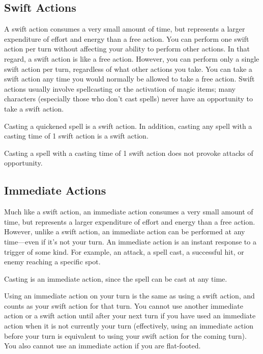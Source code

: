 \subsection{Swift Actions}
A swift action consumes a very small amount of time, but represents a larger expenditure of effort and energy than a free action. You can perform one swift action per turn without affecting your ability to perform other actions. In that regard, a swift action is like a free action. However, you can perform only a single swift action per turn, regardless of what other actions you take. You can take a swift action any time you would normally be allowed to take a free action. Swift actions usually involve spellcasting or the activation of magic items; many characters (especially those who don't cast spells) never have an opportunity to take a swift action.

Casting a quickened spell is a swift action. In addition, casting any spell with a casting time of 1 swift action is a swift action.

Casting a spell with a casting time of 1 swift action does not provoke attacks of opportunity.

\subsection{Immediate Actions}
Much like a swift action, an immediate action consumes a very small amount of time, but represents a larger expenditure of effort and energy than a free action. However, unlike a swift action, an immediate action can be performed at any time---even if it's not your turn. An immediate action is an instant response to a trigger of some kind. For example, an attack, a spell cast, a successful hit, or enemy reaching a specific spot.

Casting  is an immediate action, since the spell can be cast at any time.

Using an immediate action on your turn is the same as using a swift action, and counts as your swift action for that turn. You cannot use another immediate action or a swift action until after your next turn if you have used an immediate action when it is not currently your turn (effectively, using an immediate action before your turn is equivalent to using your swift action for the coming turn). You also cannot use an immediate action if you are flat-footed.


